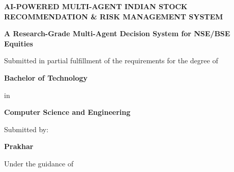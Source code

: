 \documentclass[12pt,a4paper]{report}
\begin{document}
\begin{titlepage}
    \thispagestyle{empty}
    \centering
    \vspace*{2cm}
    
    {\fontsize{16}{19.2}\bfseries\uppercase{AI-Powered Multi-Agent Indian Stock Recommendation \& Risk Management System}\par}
    
    \vspace{1.5cm}
    
    {\fontsize{14}{16.8}\bfseries A Research-Grade Multi-Agent Decision System for NSE/BSE Equities\par}
    
    \vspace{2cm}
    
    {\fontsize{12}{14.4}\selectfont Submitted in partial fulfillment of the requirements for the degree of\par}
    
    \vspace{0.5cm}
    
    {\fontsize{14}{16.8}\bfseries Bachelor of Technology\par}
    
    \vspace{0.5cm}
    
    {\fontsize{12}{14.4}\selectfont in\par}
    
    \vspace{0.5cm}
    
    {\fontsize{14}{16.8}\bfseries Computer Science and Engineering\par}
    
    \vspace{2cm}
    
    {\fontsize{12}{14.4}\selectfont Submitted by:\par}
    
    \vspace{0.5cm}
    
    {\fontsize{14}{16.8}\bfseries Prakhar\par}
    
    \vspace{1cm}
    
    {\fontsize{12}{14.4}\selectfont Under the guidance of\par}
    

\end{titlepage}
\end{document}
